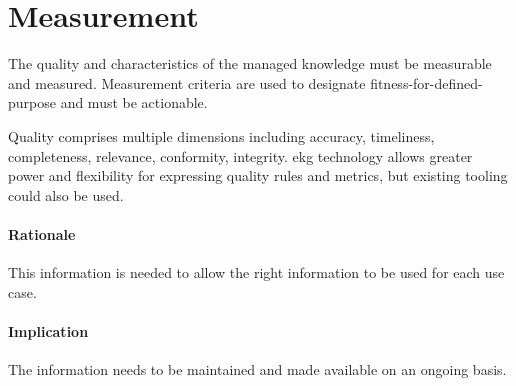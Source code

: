 \section{Measurement}\label{sec:ekg-principle-measurement}

The quality and characteristics of the managed knowledge must be measurable and measured. 
Measurement criteria are used to designate fitness-for-defined-purpose and must be actionable.

Quality comprises multiple dimensions including accuracy, timeliness, completeness, relevance, 
conformity, integrity. 
\Gls{ekg} technology allows greater power and flexibility for expressing quality rules and metrics, 
but existing  tooling could also be used.

\paragraph{Rationale}

This information is needed to allow the right information to be used for each use case.

\paragraph{Implication}

The information needs to be maintained and made available on an ongoing basis.

